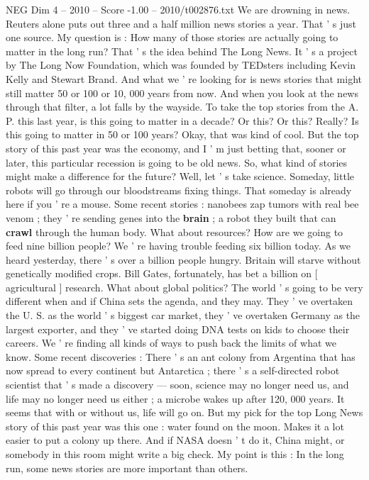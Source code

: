 \begin{textsample}{NEG Dim 4 – 2010 – Score -1.00 – 2010/t002876.txt}  \label{ex:f4_neg_021}
We are drowning in news.
Reuters alone puts out three and a half million news stories a year.
That ' s just one source.
My question is : How many of those stories are actually going to matter in the long run?
That ' s the idea behind The Long News.
It ' s a project by The Long Now Foundation, which was founded by TEDsters including Kevin Kelly and Stewart Brand.
And what we ' re looking for is news stories that might still matter 50 or 100 or 10, 000 years from now.
And when you look at the news through that filter, a lot falls by the wayside.
To take the top stories from the A.
P. this last year, is this going to matter in a decade?
Or this?
Or this?
Really?
Is this going to matter in 50 or 100 years?
Okay, that was kind of cool.
But the top story of this past year was the economy, and I ' m just betting that, sooner or later, this particular recession is going to be old news.
So, what kind of stories might make a difference for the future?
Well, let ' s take science.
Someday, little robots will go through our bloodstreams fixing things.
That someday is already here if you ' re a mouse.
Some recent stories : nanobees zap tumors with real bee venom ; they ' re sending genes into the \textbf{brain} ; a robot they built that can \textbf{crawl} through the human body.
What about resources?
How are we going to feed nine billion people?
We ' re having trouble feeding six billion today.
As we heard yesterday, there ' s over a billion people hungry.
Britain will starve without genetically modified crops.
Bill Gates, fortunately, has bet a billion on [ agricultural ] research.
What about global politics?
The world ' s going to be very different when and if China sets the agenda, and they may.
They ' ve overtaken the U.
S. as the world ' s biggest car market, they ' ve overtaken Germany as the largest exporter, and they ' ve started doing DNA tests on kids to choose their careers.
We ' re finding all kinds of ways to push back the limits of what we know.
Some recent discoveries : There ' s an ant colony from Argentina that has now spread to every continent but Antarctica ; there ' s a self-directed robot scientist that ' s made a discovery — soon, science may no longer need us, and life may no longer need us either ; a microbe wakes up after 120, 000 years.
It seems that with or without us, life will go on.
But my pick for the top Long News story of this past year was this one : water found on the moon.
Makes it a lot easier to put a colony up there.
And if NASA doesn ' t do it, China might, or somebody in this room might write a big check.
My point is this : In the long run, some news stories are more important than others.

\end{textsample}
